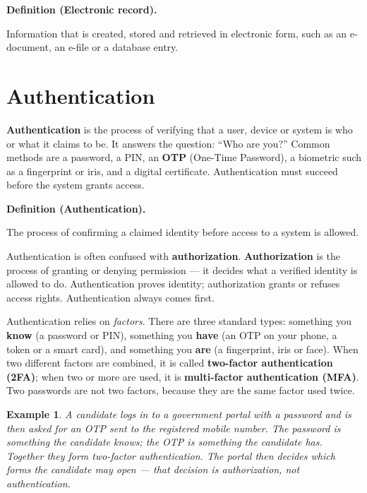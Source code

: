 \documentclass[11pt]{article}
\newtheorem{example}{Example}[section]
\newenvironment{definitionbox}[1]{%
  \par\noindent\textbf{Definition (#1).}\ \itshape
}{\par\vspace{0.3em}}
\begin{document}
\begin{definitionbox}{Electronic record}
Information that is created, stored and retrieved in electronic form, such as
an e-document, an e-file or a database entry.
\end{definitionbox}

\section{Authentication}
\textbf{Authentication} is the process of verifying that a user, device or
system is who or what it claims to be. It answers the question: ``Who are
you?'' Common methods are a password, a PIN, an \textbf{OTP} (One-Time
Password), a biometric such as a fingerprint or iris, and a digital
certificate. Authentication must succeed before the system grants access.

\begin{definitionbox}{Authentication}
The process of confirming a claimed identity before access to a system is
allowed.
\end{definitionbox}

Authentication is often confused with \textbf{authorization}.
\textbf{Authorization} is the process of granting or denying permission ---
it decides what a verified identity is allowed to do. Authentication proves
identity; authorization grants or refuses access rights. Authentication
always comes first.

Authentication relies on \emph{factors}. There are three standard types:
something you \textbf{know} (a password or PIN), something you \textbf{have}
(an OTP on your phone, a token or a smart card), and something you \textbf{are}
(a fingerprint, iris or face). When two different factors are combined, it is
called \textbf{two-factor authentication (2FA)}; when two or more are used, it
is \textbf{multi-factor authentication (MFA)}. Two passwords are not two
factors, because they are the same factor used twice.

\begin{example}
A candidate logs in to a government portal with a password and is then asked
for an OTP sent to the registered mobile number. The password is something the
candidate knows; the OTP is something the candidate has. Together they form
two-factor authentication. The portal then decides which forms the candidate
may open --- that decision is authorization, not authentication.
\end{example}
\end{document}

